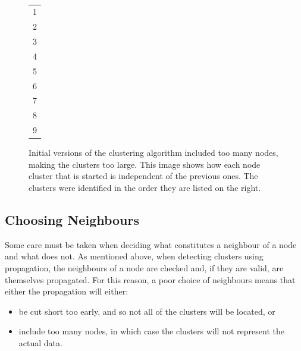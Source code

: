 
\begin{figure}[tbhp]
	\centering
	\begin{minipage}[c]{7cm}
	\end{minipage}%
	\,
	\begin{minipage}[c]{1cm}
		\centering
		\begin{tabular}[b]{l}
			\cellcolor{lyellow}1 \\
			\cellcolor{lorange}2 \\
			\cellcolor{lbrown}3 \\
			\cellcolor{lgreen}4 \\
			\cellcolor{lblue}5 \\
			\cellcolor{lpurple}6 \\
			\cellcolor{lred}7 \\
			\cellcolor{silver}8 \\
			\cellcolor{lgrey}9 \\
		\end{tabular}
	\end{minipage}

	\caption[Propagation of multiple starting locations.]{Initial versions of
		the clustering algorithm included too many nodes, making the clusters
		too large. This image shows how each node cluster that is started is
		independent of the previous ones. The clusters were identified in the
		order they are listed on the right.}\label{fig:multiple-clusters-colours}
\end{figure}

\subsection{Choosing Neighbours}
\label{sub:choosing_neighbours}

Some care must be taken when deciding what constitutes a neighbour of a node
and what does not. As mentioned above, when detecting clusters using
propagation, the neighbours of a node are checked and, if they are valid, are
themselves propagated. For this reason, a poor choice of neighbours means that
either the propagation will either:

\begin{itemize}
	\item be cut short too early, and so not all of the clusters will be
		located, or
	\item include too many nodes, in which case the clusters will not represent
		the actual data.
\end{itemize}


